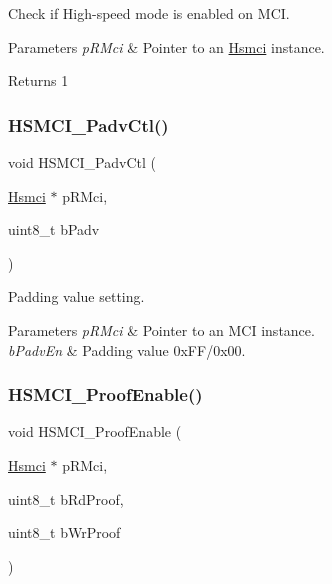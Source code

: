 Check if High-\/speed mode is enabled on M\+CI. 


\begin{DoxyParams}{Parameters}
{\em p\+R\+Mci} & Pointer to an \mbox{\hyperlink{structHsmci}{Hsmci}} instance. \\
\hline
\end{DoxyParams}
\begin{DoxyReturn}{Returns}
1 
\end{DoxyReturn}
\mbox{\label{group__hsmci__functions_ga8f832162c274c87351c980033d382c9d}} 
\subsubsection{\texorpdfstring{HSMCI\_PadvCtl()}{HSMCI\_PadvCtl()}}
{\footnotesize\ttfamily void H\+S\+M\+C\+I\+\_\+\+Padv\+Ctl (\begin{DoxyParamCaption}\item[{\mbox{\hyperlink{structHsmci}{Hsmci}} $\ast$}]{p\+R\+Mci,  }\item[{uint8\+\_\+t}]{b\+Padv }\end{DoxyParamCaption})}



Padding value setting. 


\begin{DoxyParams}{Parameters}
{\em p\+R\+Mci} & Pointer to an M\+CI instance. \\
\hline
{\em b\+Padv\+En} & Padding value 0x\+F\+F/0x00. \\
\hline
\end{DoxyParams}
\mbox{\label{group__hsmci__functions_ga7bf994f02c7a9184148767df93b74360}} 
\subsubsection{\texorpdfstring{HSMCI\_ProofEnable()}{HSMCI\_ProofEnable()}}
{\footnotesize\ttfamily void H\+S\+M\+C\+I\+\_\+\+Proof\+Enable (\begin{DoxyParamCaption}\item[{\mbox{\hyperlink{structHsmci}{Hsmci}} $\ast$}]{p\+R\+Mci,  }\item[{uint8\+\_\+t}]{b\+Rd\+Proof,  }\item[{uint8\+\_\+t}]{b\+Wr\+Proof }\end{DoxyParamCaption})}



